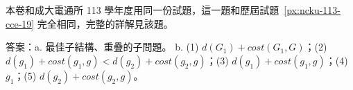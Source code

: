 \begin{pastsoln}
本卷和成大電通所 113 學年度用同一份試題，這一題和歷屆試題~\ref{px:ncku-113-cce-19} 完全相同，完整的詳解見該題。

答案：a. 最佳子結構、重疊的子問題。 b. (1) $d(G_1) + \mathit{cost}(G_1, G)$；(2) $d(g_1) + \mathit{cost}(g_1, g) < d(g_2) + \mathit{cost}(g_2, g)$；(3) $d(g_1) + \mathit{cost}(g_1, g)$；(4) $g_1$；(5) $d(g_2) + \mathit{cost}(g_2, g)$。
\end{pastsoln}
